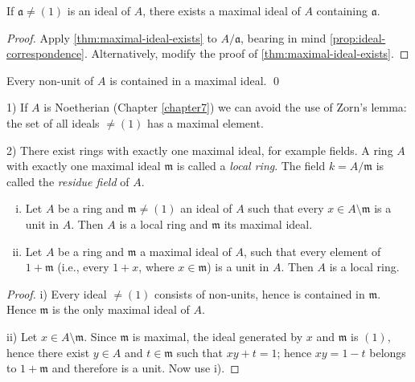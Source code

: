 \begin{corollary}\label{cor:ideal-in-maximal}
If $\mathfrak{a} \neq (1)$ is an ideal of $A$, there exists a maximal ideal of $A$ containing $\mathfrak{a}$.
\end{corollary}

\begin{proof}
Apply \eqref{thm:maximal-ideal-exists} to $A/\mathfrak{a}$, bearing in mind \eqref{prop:ideal-correspondence}. Alternatively, modify the proof of \eqref{thm:maximal-ideal-exists}.
\end{proof}

\begin{corollary}\label{cor:nonunit-in-maximal}
Every non-unit of $A$ is contained in a maximal ideal. \qed
\end{corollary}

\begin{remark}
1) If $A$ is Noetherian (Chapter \ref{chapter7}) we can avoid the use of Zorn's lemma: the set of all ideals $\neq (1)$ has a maximal element.

2) There exist rings with exactly one maximal ideal, for example fields. A ring $A$ with exactly one maximal ideal $\mathfrak{m}$ is called a \emph{local ring}. The field $k = A/\mathfrak{m}$ is called the \emph{residue field} of $A$.
\end{remark}

\begin{proposition}\label{prop:local-ring-characterization}
\begin{enumerate}[i)]
    \item Let $A$ be a ring and $\mathfrak{m} \neq (1)$ an ideal of $A$ such that every $x \in A \setminus \mathfrak{m}$ is a unit in $A$. Then $A$ is a local ring and $\mathfrak{m}$ its maximal ideal.
    \item Let $A$ be a ring and $\mathfrak{m}$ a maximal ideal of $A$, such that every element of $1 + \mathfrak{m}$ (i.e., every $1 + x$, where $x \in \mathfrak{m}$) is a unit in $A$. Then $A$ is a local ring.
\end{enumerate}
\end{proposition}

\begin{proof}
\noindent i) Every ideal $\neq (1)$ consists of non-units, hence is contained in $\mathfrak{m}$. Hence $\mathfrak{m}$ is the only maximal ideal of $A$.

ii) Let $x \in A \setminus \mathfrak{m}$. Since $\mathfrak{m}$ is maximal, the ideal generated by $x$ and $\mathfrak{m}$ is $(1)$, hence there exist $y \in A$ and $t \in \mathfrak{m}$ such that $xy + t = 1$; hence $xy = 1 - t$ belongs to $1 + \mathfrak{m}$ and therefore is a unit. Now use i).
\end{proof}

